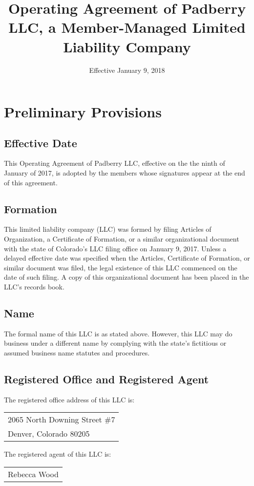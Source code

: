 \documentclass{article}
\begin{document}
\title{Operating Agreement of Padberry LLC, a Member-Managed Limited Liability Company}
\date{Effective January 9, 2018}
\maketitle

	\section{Preliminary Provisions}

			\subsection{Effective Date}
			This Operating Agreement of Padberry LLC, effective on the the ninth of January of 2017, is adopted by the members whose signatures appear at the end of this agreement.

			\subsection{Formation}
			This limited liability company (LLC) was formed by filing Articles of Organization, a Certificate of Formation, or a similar organizational document with the state of Colorado's LLC filing office on January 9, 2017. Unless a delayed effective date was specified when the Articles, Certificate of Formation, or similar document was filed, the legal existence of this LLC commenced on the date of such filing. A copy of this organizational document has been placed in the LLC's records book.

			\subsection{Name}
			The formal name of this LLC is as stated above. However, this LLC may do business under a different name by complying with the state's fictitious or assumed business name statutes and procedures.

			\subsection{Registered Office and Registered Agent}
			The registered office address of this LLC is:

			\begin{center}
				\begin{tabular}{l}
					2065 North Downing Street \#7\\
					Denver, Colorado 80205\\
				\end{tabular}
			\end{center}
			\noindent The registered agent of this LLC is:
			\begin{center}
				\begin{tabular}{l}
					Rebecca Wood\\
				\end{tabular}
			\end{center}
\end{document}
